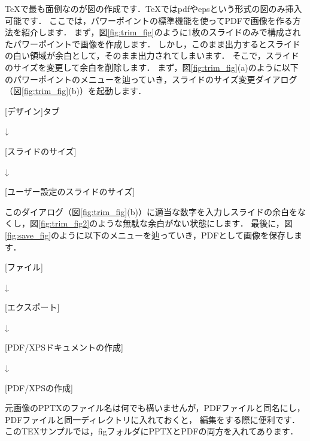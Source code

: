 \documentclass[twocolumn,a4j]{jarticle}
\begin{document}
TeXで最も面倒なのが図の作成です．TeXではpdfやepsという形式の図のみ挿入可能です．
ここでは，パワーポイントの標準機能を使ってPDFで画像を作る方法を紹介します．
まず，図\ref{fig:trim_fig}のように1枚のスライドのみで構成されたパワーポイントで画像を作成します．
しかし，このまま出力するとスライドの白い領域が余白として，そのまま出力されてしまいます．
そこで，スライドのサイズを変更して余白を削除します．
まず，図\ref{fig:trim_fig}(a)のように以下のパワーポイントのメニューを辿っていき，スライドのサイズ変更ダイアログ（図\ref{fig:trim_fig}(b)）を起動します．
%
\begin{center}
[デザイン]タブ

↓

[スライドのサイズ]

↓

[ユーザー設定のスライドのサイズ]
\end{center}
%
このダイアログ（図\ref{fig:trim_fig}(b)）に適当な数字を入力しスライドの余白をなくし，図\ref{fig:trim_fig2}のような無駄な余白がない状態にします．
最後に，図\ref{fig:save_fig}のように以下のメニューを辿っていき，PDFとして画像を保存します．
%
\begin{center}
[ファイル]

↓

[エクスポート]

↓

[PDF/XPSドキュメントの作成]

↓

[PDF/XPSの作成]
\end{center}
%
元画像のPPTXのファイル名は何でも構いませんが，PDFファイルと同名にし，PDFファイルと同一ディレクトリに入れておくと，
編集をする際に便利です．
このTEXサンプルでは，figフォルダにPPTXとPDFの両方を入れてあります．
\end{document}
